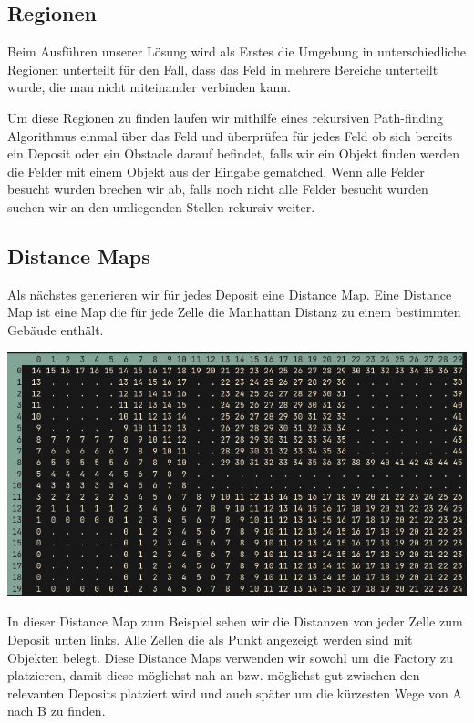 \documentclass[12pt,a4paper]{article}
\begin{document}
\subsection{Regionen}
Beim Ausführen unserer Lösung wird als Erstes die Umgebung in unterschiedliche Regionen unterteilt für den Fall, dass das Feld in mehrere Bereiche unterteilt wurde, die man nicht miteinander verbinden kann. 

Um diese Regionen zu finden laufen wir mithilfe eines rekursiven Path-finding Algorithmus einmal über das Feld und überprüfen für jedes Feld ob sich bereits ein Deposit oder ein Obstacle darauf befindet, falls wir ein Objekt finden werden die Felder mit einem Objekt aus der Eingabe gematched. Wenn alle Felder besucht wurden brechen wir ab, falls noch nicht alle Felder besucht wurden suchen wir an den umliegenden Stellen rekursiv weiter.


\newpage

\subsection{Distance Maps}
Als nächstes generieren wir für jedes Deposit eine Distance Map.
Eine Distance Map ist eine Map die für jede Zelle die Manhattan Distanz zu einem bestimmten Gebäude enthält.

\includegraphics[width=\textwidth]{distance_map.png}


In dieser Distance Map zum Beispiel sehen wir die Distanzen von jeder Zelle zum Deposit unten links. Alle Zellen die als Punkt angezeigt werden sind mit Objekten belegt. Diese Distance Maps verwenden wir sowohl um die Factory zu platzieren, damit diese möglichst nah an bzw. möglichst gut zwischen den relevanten Deposits platziert wird und auch später um die kürzesten Wege von A nach B zu finden.
\end{document}
